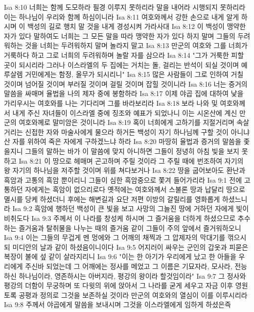 Isa 8:10  너희는 함께 도모하라 필경 이루지 못하리라 말을 내어라 시행되지 못하리라 이는 하나님이 우리와 함께 하심이니라
Isa 8:11  여호와께서 강한 손으로 내게 알게 하시며 이 백성의 길로 행치 말 것을 내게 경성시켜 가라사대
Isa 8:12  이 백성이 맹약한 자가 있다 말하여도 너희는 그 모든 말을 따라 맹약한 자가 있다 하지 말며 그들의 두려워하는 것을 너희는 두려워하지 말며 놀라지 말고
Isa 8:13  만군의 여호와 그를 너희가 거룩하다 하고 그로 너희의 두려워하며 놀랄 자를 삼으라
Isa 8:14  "그가 거룩한 피할 곳이 되시리라 그러나 이스라엘의 두 집에는 거치는 돌, 걸리는 반석이 되실 것이며 예루살렘 거민에게는 함정, 올무가 되시리니"
Isa 8:15  많은 사람들이 그로 인하여 거칠 것이며 넘어질 것이며 부러질 것이며 걸릴 것이며 잡힐 것이니라
Isa 8:16  너는 증거의 말씀을 싸매며 율법을 나의 제자 중에 봉함하라
Isa 8:17  이제 야곱 집에 대하여 낯을 가리우시는 여호와를 나는 기다리며 그를 바라보리라
Isa 8:18  보라 나와 및 여호와께서 내게 주신 자녀들이 이스라엘 중에 징조와 예표가 되었나니 이는 시온산에 계신 만군의 여호와께로 말미암은 것이니라
Isa 8:19  혹이 너희에게 고하기를 지절거리며 속살거리는 신접한 자와 마술사에게 물으라 하거든 백성이 자기 하나님께 구할 것이 아니냐 산 자를 위하여 죽은 자에게 구하겠느냐 하라
Isa 8:20  마땅히 율법과 증거의 말씀을 좇을지니 그들의 말하는 바가 이 말씀에 맞지 아니하면 그들이 정녕히 아침 빛을 보지 못하고
Isa 8:21  이 땅으로 헤매며 곤고하며 주릴 것이라 그 주릴 때에 번조하여 자기의 왕 자기의 하나님을 저주할 것이며 위를 쳐다보거나
Isa 8:22  땅을 굽어보아도 환난과 흑암과 고통의 흑암 뿐이리니 그들이 심한 흑암중으로 쫓겨 들어가리라
Isa 9:1  전에 고통하던 자에게는 흑암이 없으리로다 옛적에는 여호와께서 스불론 땅과 납달리 땅으로 멸시를 당케 하셨더니 후에는 해변길과 요단 저편 이방의 갈릴리를 영화롭게 하셨느니라
Isa 9:2  흑암에 행하던 백성이 큰 빛을 보고 사망의 그늘진 땅에 거하던 자에게 빛이 비취도다
Isa 9:3  주께서 이 나라를 창성케 하시며 그 즐거움을 더하게 하셨으므로 추수하는 즐거움과 탈취물을 나누는 때의 즐거움 같이 그들이 주의 앞에서 즐거워하오니
Isa 9:4  이는 그들의 무겁게 멘 멍에와 그 어깨의 채찍과 그 압제자의 막대기를 꺾으시되 미디안의 날과 같이 하셨음이니이다
Isa 9:5  어지러이 싸우는 군인의 갑옷과 피묻은 복장이 불에 섶 같이 살라지리니
Isa 9:6  "이는 한 아기가 우리에게 났고 한 아들을 우리에게 주신바 되었는데 그 어깨에는 정사를 메었고 그 이름은 기묘자라, 모사라, 전능하신 하나님이라, 영존하시는 아버지라, 평강의 왕이라 할것임이라"
Isa 9:7  그 정사와 평강의 더함이 무궁하며 또 다윗의 위에 앉아서 그 나라를 굳게 세우고 자금 이후 영원토록 공평과 정의로 그것을 보존하실 것이라 만군의 여호와의 열심이 이를 이루시리라
Isa 9:8  주께서 야곱에게 말씀을 보내시며 그것을 이스라엘에게 임하게 하셨은즉
